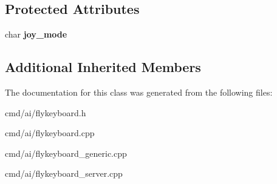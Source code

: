 \subsection*{Protected Attributes}
\begin{DoxyCompactItemize}
\item 
char {\bfseries joy\+\_\+mode}\hypertarget{classFlyByKeyboard_a809cfc29446afcb096fd22371a1ff35e}{}\label{classFlyByKeyboard_a809cfc29446afcb096fd22371a1ff35e}

\end{DoxyCompactItemize}
\subsection*{Additional Inherited Members}


The documentation for this class was generated from the following files\+:\begin{DoxyCompactItemize}
\item 
cmd/ai/flykeyboard.\+h\item 
cmd/ai/flykeyboard.\+cpp\item 
cmd/ai/flykeyboard\+\_\+generic.\+cpp\item 
cmd/ai/flykeyboard\+\_\+server.\+cpp\end{DoxyCompactItemize}
